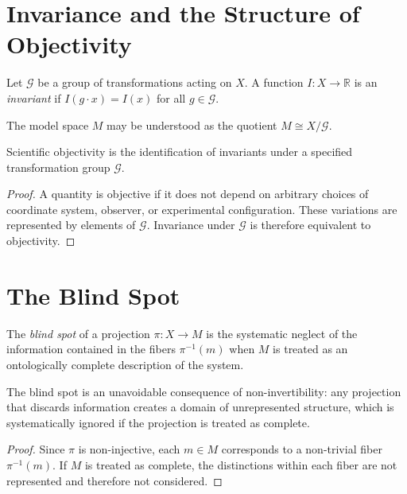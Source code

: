 \documentclass[11pt,openany]{book}
\begin{document}
\section{Invariance and the Structure of Objectivity}
\label{sec:invariance}

\begin{definition}[Invariant]
Let $\mathcal{G}$ be a group of transformations acting on
$X$. A function $I : X \to \mathbb{R}$ is an
\emph{invariant} if $I(g \cdot x) = I(x)$ for all
$g \in \mathcal{G}$.
\end{definition}

The model space $M$ may be understood as the quotient
$M \cong X / \mathcal{G}$.

\begin{proposition}
Scientific objectivity is the identification of invariants
under a specified transformation group $\mathcal{G}$.
\end{proposition}

\begin{proof}
A quantity is objective if it does not depend on arbitrary
choices of coordinate system, observer, or experimental
configuration. These variations are represented by elements
of $\mathcal{G}$. Invariance under $\mathcal{G}$ is
therefore equivalent to objectivity.
\end{proof}

\section{The Blind Spot}
\label{sec:blind-spot}

\begin{definition}
The \emph{blind spot} of a projection $\pi : X \to M$ is
the systematic neglect of the information contained in the
fibers $\pi^{-1}(m)$ when $M$ is treated as an
ontologically complete description of the system.
\end{definition}

\begin{proposition}
The blind spot is an unavoidable consequence of
non-invertibility: any projection that discards information
creates a domain of unrepresented structure, which is
systematically ignored if the projection is treated as
complete.
\end{proposition}

\begin{proof}
Since $\pi$ is non-injective, each $m \in M$ corresponds
to a non-trivial fiber $\pi^{-1}(m)$. If $M$ is treated as
complete, the distinctions within each fiber are not
represented and therefore not considered.
\end{proof}
\end{document}
